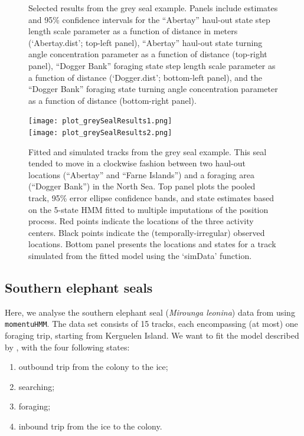 \documentclass[12pt]{article}\usepackage[]{graphicx}\usepackage[]{xcolor}
\newcommand{\stoptocwriting}{%
  \addtocontents{toc}{\protect\setcounter{tocdepth}{-5}}}
\begin{document}
\begin{figure}[htbp]
  \caption{Selected results from the grey seal example. Panels include estimates and 95\% confidence intervals for the ``Abertay'' haul-out state step length scale parameter as a function of distance in meters (`Abertay.dist'; top-left panel), ``Abertay'' haul-out state turning angle concentration parameter as a function of distance (top-right panel), ``Dogger Bank'' foraging state step length scale parameter as a function of distance (`Dogger.dist'; bottom-left panel), and the ``Dogger Bank'' foraging state turning angle concentration parameter as a function of distance (bottom-right panel).}
  \label{fig:greySealResults}
\end{figure}

\begin{figure}[htbp]
  \centering
    \texttt{[image: plot\_greySealResults1.png]}\\
    \texttt{[image: plot\_greySealResults2.png]}
  \caption{Fitted and simulated tracks from the grey seal example. This seal tended to move in a clockwise fashion between two haul-out locations (``Abertay'' and ``Farne Islands'') and a foraging area (``Dogger Bank'') in the North Sea. Top panel plots the pooled track, 95\% error ellipse confidence bands, and state estimates based on the 5-state HMM fitted to multiple imputations of the position process. Red points indicate the locations of the three activity centers. Black points indicate the (temporally-irregular) observed locations. Bottom panel presents the locations and states for a track simulated from the fitted model using the `simData' function.}
  \label{fig:greySealStateSims}
\end{figure}

\subsection{Southern elephant seals}
\label{sec:ses}
\stoptocwriting
Here, we analyse the southern elephant seal (\emph{Mirounga leonina}) data from \cite{MichelotEtAl2017} using \verb|momentuHMM|. The data set consists of 15 tracks, each encompassing (at most) one foraging trip, starting from Kerguelen Island. We want to fit the model described by \cite{MichelotEtAl2017}, with the four following states:
\begin{enumerate}
\item outbound trip from the colony to the ice;
\item searching;
\item foraging;
\item inbound trip from the ice to the colony.
\end{enumerate}
\end{document}
